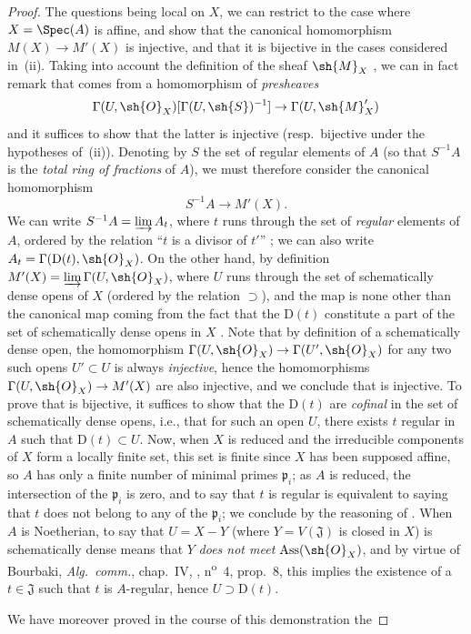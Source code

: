 \begin{proof}
The questions being local on $X$, we can restrict to the case where $X=\Spec(A)$ is affine, and show that the canonical homomorphism $M(X)\to M'(X)$ is injective, and that it is bijective in the cases considered in~(ii).
Taking into account the definition of the sheaf $\sh{M}_X$ , we can in fact remark that  comes from a homomorphism of \emph{presheaves}
\[
  \Gamma(U,\sh{O}_X)[\Gamma(U,\sh{S})^{-1}]\to\Gamma(U,\sh{M}'_X)
\]
and it suffices to show that the latter is injective (resp.\ bijective under the hypotheses of~(ii)).
Denoting by $S$ the set of regular elements of $A$ (so that $S^{-1}A$ is the \emph{total ring of fractions} of $A$), we must therefore consider the canonical homomorphism
\[
\label{IV.20.2.11.1}
  S^{-1}A\to M'(X).
  \tag{20.2.11.1}
\]
We can write $S^{-1}A=\varinjlim A_t$, where $t$ runs through the set of \emph{regular} elements of $A$, ordered by the relation ``$t$ is a divisor of $t'$'' ;
we can also write $A_t=\Gamma(\mathrm{D}(t),\sh{O}_X)$.
On the other hand, by definition $M'(X)=\varinjlim\Gamma(U,\sh{O}_X)$, where $U$ runs through the set of schematically dense opens of $X$ (ordered by the relation $\supset$), and the map  is none other than the canonical map coming from the fact that the $\mathrm{D}(t)$ constitute a part of the set of schematically dense opens in $X$ .
Note that by definition of a schematically dense open, the homomorphism $\Gamma(U,\sh{O}_X)\to\Gamma(U',\sh{O}_X)$ for any two such opens $U'\subset U$ is always \emph{injective}, hence the homomorphisms $\Gamma(U,\sh{O}_X)\to M'(X)$ are also injective, and we conclude that  is injective.
To prove that  is bijective, it suffices to show that the $\mathrm{D}(t)$ are \emph{cofinal} in the set of schematically dense opens, i.e., that for such an open $U$, there exists $t$ regular in $A$ such that $\mathrm{D}(t)\subset U$.
Now, when $X$ is reduced and the irreducible components of $X$ form a locally finite set, this set is finite since $X$ has been supposed affine, so $A$ has only a finite number of minimal primes $\mathfrak{p}_i$;
as $A$ is reduced, the intersection of the $\mathfrak{p}_i$ is zero, and to say that $t$ is regular is equivalent to saying that $t$ does not belong to any of the $\mathfrak{p}_i$;
we conclude by the reasoning of .
When $A$ is Noetherian, to say that $U=X-Y$ (where $Y=V(\mathfrak{J})$ is closed in $X$) is schematically dense means  that $Y$ \emph{does not meet} $\operatorname{Ass}(\sh{O}_X)$, and by virtue of Bourbaki, \emph{Alg.~comm.}, chap.~IV, , n\textsuperscript{o}~4, prop.~8, this implies the existence of a $t\in\mathfrak{J}$ such that $t$ is $A$-regular, hence $U\supset\mathrm{D}(t)$.

We have moreover proved in the course of this demonstration the
\end{proof}


